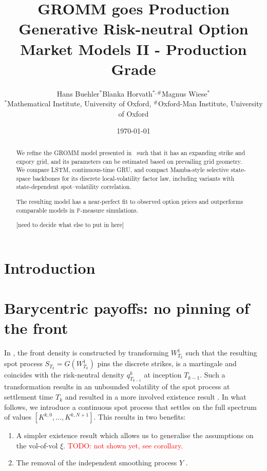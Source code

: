 \documentclass[11pt]{article}
\title{%
  \textbf{GROMM goes Production}\\[6pt]
  \large Generative Risk-neutral Option Market Models II - Production Grade
}
\author{Hans Buehler$^{*}$\qquad Blanka Horvath$^{*,\#}$\qquad Magnus Wiese$^{*}$\\[0.6em]
  {\small $^{*}$Mathematical Institute, University of Oxford,
  $^{\#}$Oxford-Man Institute, University of Oxford}}
\date{\today}
\newcommand{\PP}{\mathbb P}
\theoremstyle{plain}
\theoremstyle{definition}
\theoremstyle{remark}
\begin{document}
\maketitle

\begin{abstract}
   We refine the GROMM model presented in~\cite{GROMM2026} such that it has an expanding strike and expory grid, and
   its parameters can be estimated based on prevailing grid geometry. We compare LSTM, continuous-time GRU, and compact
   Mamba-style selective state-space backbones for its discrete local-volatility factor law, including variants with
   state-dependent spot--volatility correlation.

   The resulting model has a near-perfect
   fit to observed option prices and outperforms comparable models in $\PP$-measure simulations.

   [need to decide what else to put in here]
\end{abstract}

\tableofcontents


\section{Introduction}\label{sec:intro}


\section{Barycentric payoffs: no pinning of the front}
In \cite{GROMM2026}, the front density is constructed by transforming $W^1_{T_k}$ such that the resulting spot process $ S_{T_k} = G(W^1_{T_k})$ pins the discrete strikes, is a martingale and coincides with the risk-neutral density $q_{T_{k-1}}^{k}$ at inception $T_{k-1}$. Such a transformation results in an unbounded volatility of the spot process at settlement time $T_k$ and resulted in a more involved existence result \cite[Theorem 2.2]{GROMM2026}. In what follows, we introduce a continuous spot process that settles on the full spectrum of values $[K^{k, 0}, \dots, K^{k, N+1}]$. This results in two benefits:
\begin{enumerate}
  \item A simpler existence result which allows us to generalise the assumptions on the vol-of-vol $\xi$. \textcolor{red}{TODO: not shown yet, see corollary.} 
  \item The removal of the independent smoothing process $Y$  \cite{SANOS2026}. 
\end{enumerate}
\end{document}
